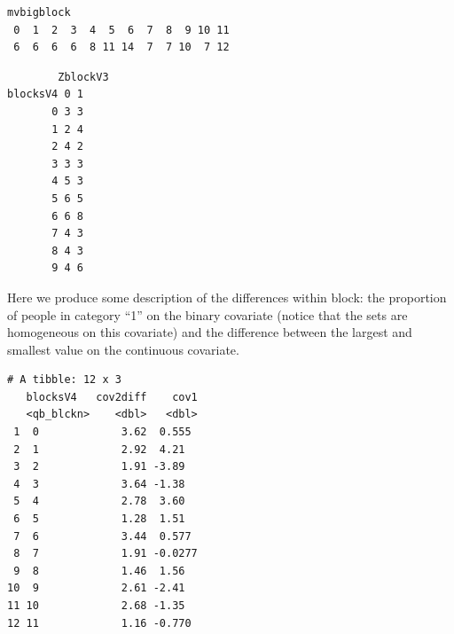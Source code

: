 \documentclass[
  12pt,
]{book}
\newenvironment{Shaded}{\begin{snugshade}}{\end{snugshade}}
\newcommand{\DataTypeTok}[1]{\textcolor[rgb]{0.13,0.29,0.53}{#1}}
\newcommand{\DecValTok}[1]{\textcolor[rgb]{0.00,0.00,0.81}{#1}}
\newcommand{\KeywordTok}[1]{\textcolor[rgb]{0.13,0.29,0.53}{\textbf{#1}}}
\newcommand{\NormalTok}[1]{#1}
\newcommand{\OperatorTok}[1]{\textcolor[rgb]{0.81,0.36,0.00}{\textbf{#1}}}
\newcommand{\StringTok}[1]{\textcolor[rgb]{0.31,0.60,0.02}{#1}}
\theoremstyle{definition}
\theoremstyle{definition}
\theoremstyle{definition}
\theoremstyle{remark}
\begin{document}
\begin{verbatim}
mvbigblock
 0  1  2  3  4  5  6  7  8  9 10 11 
 6  6  6  6  8 11 14  7  7 10  7 12 
\end{verbatim}

\begin{Shaded}
\end{Shaded}

\begin{verbatim}
        ZblockV3
blocksV4 0 1
       0 3 3
       1 2 4
       2 4 2
       3 3 3
       4 5 3
       5 6 5
       6 6 8
       7 4 3
       8 4 3
       9 4 6
\end{verbatim}

Here we produce some description of the differences within block: the
proportion of people in category ``1'' on the binary covariate (notice
that the sets are homogeneous on this covariate) and the difference
between the largest and smallest value on the continuous covariate.

\begin{Shaded}
\end{Shaded}

\begin{verbatim}
# A tibble: 12 x 3
   blocksV4   cov2diff    cov1
   <qb_blckn>    <dbl>   <dbl>
 1  0             3.62  0.555 
 2  1             2.92  4.21  
 3  2             1.91 -3.89  
 4  3             3.64 -1.38  
 5  4             2.78  3.60  
 6  5             1.28  1.51  
 7  6             3.44  0.577 
 8  7             1.91 -0.0277
 9  8             1.46  1.56  
10  9             2.61 -2.41  
11 10             2.68 -1.35  
12 11             1.16 -0.770 
\end{verbatim}
\end{document}
